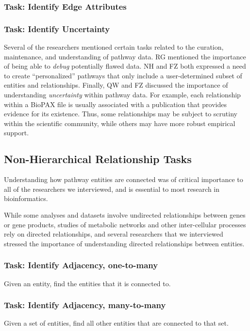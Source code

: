 \documentclass{egpubl}
\begin{document}
\subsubsection{Task: Identify Edge Attributes}
\subsubsection{Task: Identify Uncertainty}
Several of the researchers mentioned certain tasks related to the curation, maintenance, and understanding of pathway data. RG mentioned the importance of being able to \emph{debug} potentially flawed data. NH and FZ both expressed a need to create ``personalized'' pathways that only include a user-determined subset of entities and relationships. Finally, QW and FZ discussed the importance of understanding \emph{uncertainty} within pathway data. For example, each relationship within a BioPAX file is usually associated with a publication that provides evidence for its existence. Thus, some relationships may be subject to scrutiny within the scientific community, while others may have more robust empirical support.

\subsection{Non-Hierarchical Relationship Tasks}

Understanding how pathway entities are connected was of critical importance to all of the researchers we interviewed, and is essential to most research in bioinformatics.

While some analyses and datasets involve undirected relationships between genes or gene products, studies of metabolic networks and other inter-cellular processes rely on directed relationships, and several researchers that we interviewed stressed the importance of understanding directed relationships between entities.

\subsubsection{Task: Identify Adjacency, one-to-many}
Given an entity, find the entities that it is connected to.

\subsubsection{Task: Identify Adjacency, many-to-many}
Given a set of entities, find all other entities that are connected to that set.
\end{document}
